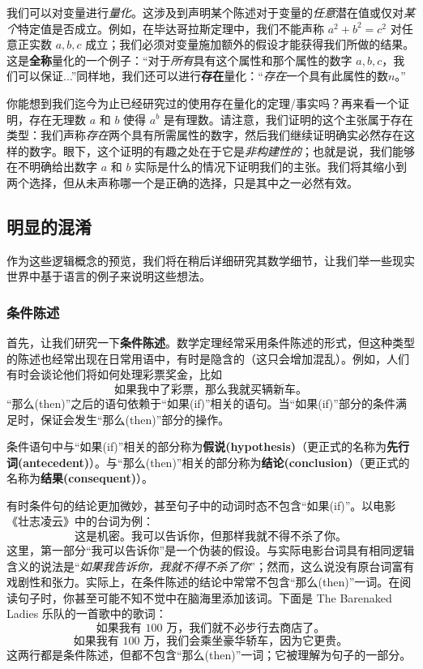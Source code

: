 我们可以对变量进行\emph{量化}。这涉及到声明某个陈述对于变量的\emph{任意}潜在值或仅对\emph{某个}特定值是否成立。例如，在毕达哥拉斯定理中，我们不能声称 $a^2+b^2=c^2$ 对任意正实数 $a,b,c$ 成立；我们必须对变量施加额外的假设才能获得我们所做的结果。这是\textbf{全称}量化的一个例子：``对于\emph{所有}具有这个属性和那个属性的数字 $a,b,c$，我们可以保证...''同样地，我们还可以进行\textbf{存在}量化：``\emph{存在}一个具有此属性的数$n$。''

你能想到我们迄今为止已经研究过的使用存在量化的定理/事实吗？再来看一个证明，存在无理数 $a$ 和 $b$ 使得 $a^b$ 是有理数。请注意，我们证明的这个主张属于存在类型：我们声称\emph{存在}两个具有所需属性的数字，然后我们继续证明确实必然存在这样的数字。眼下，这个证明的有趣之处在于它是\emph{非构建性的}；也就是说，我们能够在不明确给出数字 $a$ 和 $b$ 实际是什么的情况下证明我们的主张。我们将其缩小到两个选择，但从未声称哪一个是正确的选择，只是其中之一必然有效。

\subsection{明显的混淆}

作为这些逻辑概念的预览，我们将在稍后详细研究其数学细节，让我们举一些现实世界中基于语言的例子来说明这些想法。

\subsubsection*{条件陈述}

首先，让我们研究一下\textbf{条件陈述}。数学定理经常采用条件陈述的形式，但这种类型的陈述也经常出现在日常用语中，有时是隐含的（这只会增加混乱）。例如，人们有时会谈论他们将如何处理彩票奖金，比如
\[\text{如果我中了彩票，那么我就买辆新车。}\]
``那么(then)''之后的语句依赖于``如果(if)''相关的语句。当``如果(if)''部分的条件满足时，保证会发生``那么(then)''部分的操作。

条件语句中与``如果(if)''相关的部分称为\textbf{假说(hypothesis)}（更正式的名称为\textbf{先行词(antecedent)}）。与``那么(then)''相关的部分称为\textbf{结论(conclusion)}（更正式的名称为\textbf{结果(consequent)}）。

有时条件句的结论更加微妙，甚至句子中的动词时态不包含``如果(if)''。以电影《壮志凌云》中的台词为例：
\[\text{这是机密。我可以告诉你，但那样我就不得不杀了你。}\]
这里，第一部分``我可以告诉你''是一个伪装的假设。与实际电影台词具有相同逻辑含义的说法是``\emph{如果我告诉你，我就不得不杀了你}''；然而，这么说没有原台词富有戏剧性和张力。实际上，在条件陈述的结论中常常不包含``那么(then)''一词。在阅读句子时，你甚至可能不知不觉中在脑海里添加该词。下面是 The Barenaked Ladies 乐队的一首歌中的歌词：
\[\text{如果我有 100 万，我们就不必步行去商店了。}\]
\[\text{如果我有 100 万，我们会乘坐豪华轿车，因为它更贵。}\]
这两行都是条件陈述，但都不包含``那么(then)''一词；它被理解为句子的一部分。

